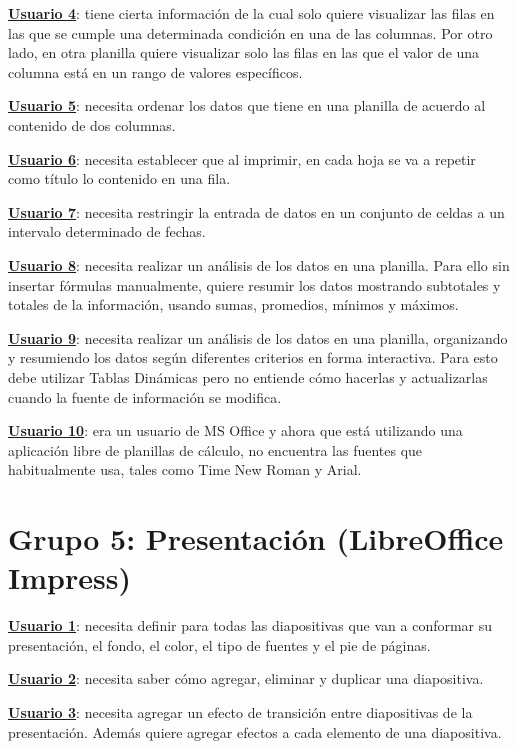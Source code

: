 \documentclass[12pt]{article}
\begin{document}
\textbf{\underline{Usuario 4}}: tiene cierta información de la cual solo quiere visualizar las filas en las que se cumple una determinada condición en una de las columnas. Por otro lado, en otra planilla quiere visualizar solo las filas en las que el valor de una columna está en un rango de valores específicos.

\textbf{\underline{Usuario 5}}: necesita ordenar los datos que tiene en una planilla de acuerdo al contenido de dos columnas.

\textbf{\underline{Usuario 6}}: necesita establecer que al imprimir, en cada hoja se va a repetir como título lo contenido en una fila. 

\textbf{\underline{Usuario 7}}: necesita restringir la entrada de datos en un conjunto de celdas a un intervalo determinado de fechas.

\textbf{\underline{Usuario 8}}: necesita realizar un análisis de los datos en una planilla. Para ello sin insertar fórmulas manualmente, quiere resumir los datos mostrando subtotales y  totales de la información, usando sumas, promedios, mínimos y máximos.

\textbf{\underline{Usuario 9}}: necesita realizar un análisis de los datos en una planilla, organizando y resumiendo los datos según diferentes criterios en forma interactiva. Para esto debe utilizar Tablas Dinámicas pero no entiende cómo hacerlas y actualizarlas cuando la fuente de información se modifica.

\textbf{\underline{Usuario 10}}: era un usuario de MS Office y ahora que está utilizando una aplicación libre de planillas de cálculo, no encuentra las fuentes que habitualmente usa, tales como Time New Roman y Arial.

\section*{\textbf{Grupo 5: Presentación (LibreOffice Impress)}}

\textbf{\underline{Usuario 1}}: necesita definir para todas las diapositivas que van a conformar su presentación, el fondo, el color, el tipo de fuentes y el pie de páginas.

\textbf{\underline{Usuario 2}}: necesita saber cómo agregar, eliminar y duplicar una diapositiva.

\textbf{\underline{Usuario 3}}: necesita agregar un efecto de transición entre diapositivas de la presentación. Además quiere agregar efectos a cada elemento de una diapositiva.
\end{document}
